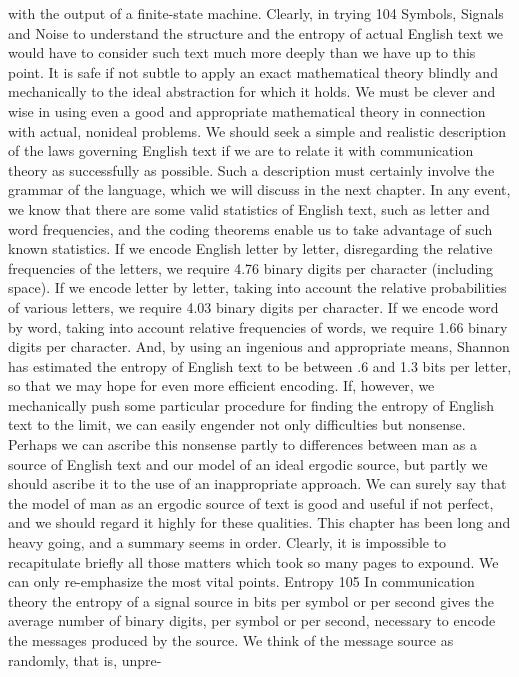 {{{with the output of a finite-state machine. Clearly, in trying
104
Symbols, Signals and Noise
to understand the structure and the entropy of actual English text
we would have to consider such text much more deeply than we
have up to this point.
It is safe if not subtle to apply an exact mathematical theory
blindly and mechanically to the ideal abstraction for which it holds.
We must be clever and wise in using even a good and appropriate
mathematical theory in connection with actual, nonideal problems.
We should seek a simple and realistic description of the laws governing
English text if we are to relate it with communication theory
as successfully as possible. Such a description must certainly
involve the grammar of the language, which we will discuss in the
next chapter.
In any event, we know that there are some valid statistics of
English text, such as letter and word frequencies, and the coding
theorems enable us to take advantage of such known statistics.
If we encode English letter by letter, disregarding the relative
frequencies of the letters, we require 4.76 binary digits per character
(including space). If we encode letter by letter, taking into account
the relative probabilities of various letters, we require 4.03 binary
digits per character. If we encode word by word, taking into
account relative frequencies of words, we require 1.66 binary digits
per character. And, by using an ingenious and appropriate means,
Shannon has estimated the entropy of English text to be between
.6 and 1.3 bits per letter, so that we may hope for even more
efficient encoding.
If, however, we mechanically push some particular procedure
for finding the entropy of English text to the limit, we can easily
engender not only difficulties but nonsense. Perhaps we can ascribe
this nonsense partly to differences between man as a source of
English text and our model of an ideal ergodic source, but partly
we should ascribe it to the use of an inappropriate approach. We
can surely say that the model of man as an ergodic source of text
is good and useful if not perfect, and we should regard it highly
for these qualities.
This chapter has been long and heavy going, and a summary
seems in order. Clearly, it is impossible to recapitulate briefly all
those matters which took so many pages to expound. We can only
re-emphasize the most vital points.
Entropy 105
In communication theory the entropy of a signal source in bits
per symbol or per second gives the average number of binary
digits, per symbol or per second, necessary to encode the messages
produced by the source.
We think of the message source as randomly, that is, unpre-
}}}
